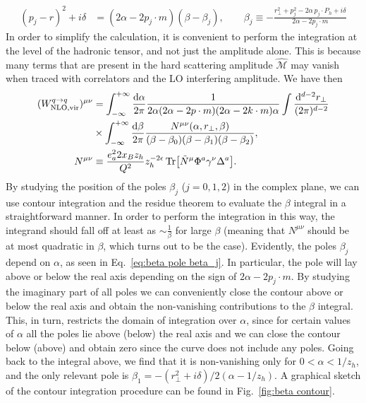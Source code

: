 \begin{equation}\label{eq:beta pole beta_j}
\begin{aligned}
        (p_j-r)^2+i\delta&=(2\alpha-2p_j \cdot m)(\beta - \beta_j),\qquad \beta_j\equiv -\frac{r_\perp^2+p_j^2-2\alpha \,p_j\cdot P_h+i\delta}{2\alpha-2p_j\cdot m}
\end{aligned}
\end{equation}
In order to simplify the calculation, it is convenient to perform the integration at the level of the hadronic tensor, and not just the amplitude alone. This is because many terms that are present in the hard scattering amplitude $\hat{\mathcal{M}}$ may vanish when traced with correlators and the LO interfering amplitude. We have then
\begin{equation}
\begin{aligned}
       (W^{q \to q}_{\text{NLO,vir}})^{\mu\nu} &=\int_{-\infty}^{+\infty}\frac{\dd \alpha}{2\pi} \frac{1}{2\alpha(2\alpha-2p \cdot m)(2\alpha-2 k \cdot m)\alpha}\int \frac{\dd^{d-2}r_\perp}{(2\pi)^{d-2}}\\
       &\times\int_{-\infty}^{+\infty}\frac{\dd \beta}{2\pi}\frac{N^{\mu\nu}(\alpha,r_\perp,\beta)}{(\beta-\beta_0)(\beta-\beta_1)(\beta-\beta_2)},\\
        N^{\mu\nu}&\equiv \frac{e_a^2 2x_B z_h }{Q^2}z_h^{-2\epsilon}\Tr[\tilde N^\mu\Phi^a\gamma^\nu \Delta^a].
\end{aligned}
\end{equation}
By studying the position of the poles $\beta_j$ ($j=0,1,2$) in the complex plane, we can use contour integration and the residue theorem to evaluate the $\beta$ integral in a straightforward manner. In order to perform the integration in this way, the integrand should fall off at least as $\sim\frac{1}{\beta}$ for large $\beta$ (meaning that $N^{\mu\nu}$ should be at most quadratic in $\beta$, which turns out to be the case). Evidently, the poles $\beta_j$ depend on $\alpha$, as seen in Eq.~\eqref{eq:beta pole beta_j}. In particular, the pole will lay above or below the real axis depending on the sign of $2\alpha-2p_j\cdot m$. By studying the imaginary part of all poles we can conveniently close the contour above or below the real axis and obtain the non-vanishing contributions to the $\beta$ integral. This, in turn, restricts the domain of integration over $\alpha$, since for certain values of $\alpha$ all the poles lie above (below) the real axis and we can close the contour below (above) and obtain zero since the curve does not include any poles. Going back to the integral above, we find that it is non-vanishing only for $0<\alpha<1/z_h$, and the only relevant pole is $\beta_1 = -(r_\perp^2+i\delta)/2(\alpha-1/z_h)$. A graphical sketch of the contour integration procedure can be found in Fig.~\ref{fig:beta contour}.

